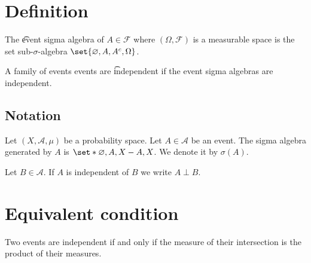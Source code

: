 
\section*{Definition}

The \t{event sigma algebra} of $A \in \mathcal{F} $ where $(\Omega , \mathcal{F} )$ is a measurable space is the set sub-$\sigma $-algebra $\set{\varnothing, A, A^c, \Omega }$.

A family of events events are \t{independent} if the event sigma algebras are independent.

\subsection*{Notation}

Let $(X, \mathcal{A} , \mu )$ be a probability space.
Let $A \in \mathcal{A} $ be an event.
The sigma algebra generated by $A$ is $\set*{\varnothing, A, X - A, X}$.
We denote it by $\sigma (A)$.

Let $B \in \mathcal{A} $.
If $A$ is independent of $B$ we write $A \perp  B$.

\section*{Equivalent condition}

\begin{proposition}
Two events are independent if and only if the measure of their intersection is the product of their measures.
\end{proposition}

